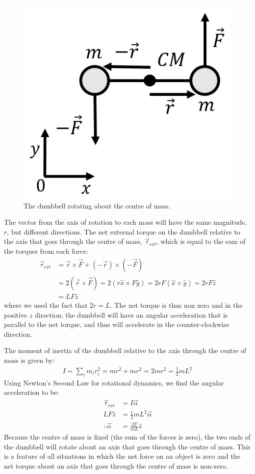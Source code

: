 \begin{framed}
\begin{framed}
\begin{figure}[!htbp]
\centering
\includegraphics[width=0.375\linewidth]{files/dumbbell_CM-4d677e8005126f5dc3da186bdcf6c161.png}
\caption[]{The dumbbell rotating about the centre of mass.}
\label{fig:rotationaldynamics:dumbbell_CM}
\end{figure}

The vector from the axis of rotation to each mass will have the same magnitude, $r$, but different directions. The net external torque on the dumbbell relative to the axis that goes through the centre of mass, $\vec\tau_{ext}$, which is equal to the sum of the torques from each force:
\begin{align*}
\vec\tau_{ext}&= \vec r \times \vec F + (-\vec r) \times (-\vec F) \\
&= 2 (\vec r \times \vec F)=2 (r\hat x \times F\hat y) = 2rF (\hat x \times \hat y)=2rF\hat z\\
&=LF\hat z
\end{align*}
where we used the fact that $2r = L$. The net torque is thus non zero and in the positive $z$ direction; the dumbbell will have an angular acceleration that is parallel to the net torque, and thus will accelerate in the counter-clockwise direction.

The moment of inertia of the dumbbell relative to the axis through the centre of mass is given by:
\begin{align*}
I = \sum_i  m_ir_i^2 = mr^2 +mr^2 = 2mr^2 = \frac{1}{2}mL^2
\end{align*}
Using Newton's Second Law for rotational dynamics, we find the angular acceleration to be:
\begin{align*}
\vec\tau_{ext}&= I\vec\alpha\\
LF\hat z&=\frac{1}{2}mL^2\vec\alpha\\
\therefore \vec\alpha &= \frac{2F}{mL}\hat z
\end{align*}
Because the centre of mass is fixed (the sum of the forces is zero), the two ends of the dumbbell will rotate about an axis that goes through the centre of mass. This is a feature of all situations in which the net force on an object is zero and the net torque about an axis that goes through the centre of mass is non-zero.


\end{framed}
\end{framed}
